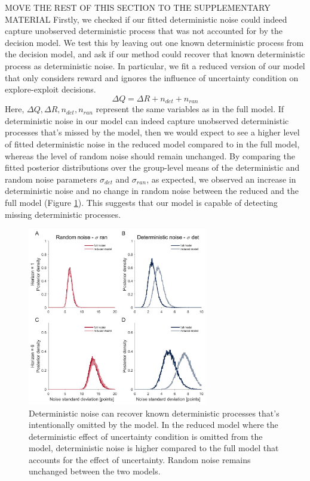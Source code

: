 \documentclass[12pt]{article}
\begin{document}
{ MOVE THE REST OF THIS SECTION TO THE SUPPLEMENTARY MATERIAL
 Firstly, we checked if our fitted deterministic noise could indeed capture unobserved deterministic process that was not accounted for by the decision model. We test this by leaving out one known deterministic process from the decision model, and ask if our method could recover that known deterministic process as deterministic noise. In particular, we fit a reduced version of our model that only considers reward and ignores the influence of uncertainty condition on explore-exploit decisions.  
	$$\Delta Q= \Delta R+n_{det}+n_{ran}$$
	Here, $\Delta Q, \Delta R, n_{det}, n_{ran}$ represent the same variables as in the full model.	If deterministic noise in our model can indeed capture unobserved deterministic processes that's missed by the model, then we would expect to see a higher level of fitted deterministic noise in the reduced model compared to in the full model, whereas the level of random noise should remain unchanged. By comparing the	fitted posterior distributions over the group-level means of the deterministic and random noise parameters $\sigma_{det}$ and $\sigma_{ran}$, as expected, we observed an increase in deterministic noise and no change in random noise between the reduced and the full model (Figure \ref{fig:reducedmodel}). This suggests that our model is capable of detecting missing deterministic processes.
	}
	\begin{figure}[H]
		\begin{center}
			\includegraphics[width=0.7\textwidth]{figures/RDBayes_reduced_model.jpg}
			\caption{Deterministic noise can recover known deterministic processes that's intentionally omitted by the model. In the reduced model where the deterministic effect of uncertainty condition is omitted from the model, deterministic noise is higher compared to the full model that accounts for the effect of uncertainty. Random noise remains unchanged between the two models.}
			\label{fig:reducedmodel}
		\end{center}
	\end{figure} 
\end{document}
